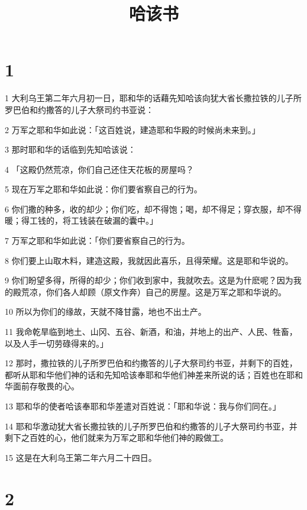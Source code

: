 

\title{哈该书}


\chapter{1}

\par 1 大利乌王第二年六月初一日，耶和华的话藉先知哈该向犹大省长撒拉铁的儿子所罗巴伯和约撒答的儿子大祭司约书亚说：
\par 2 万军之耶和华如此说：「这百姓说，建造耶和华殿的时候尚未来到。」
\par 3 那时耶和华的话临到先知哈该说：
\par 4 「这殿仍然荒凉，你们自己还住天花板的房屋吗？
\par 5 现在万军之耶和华如此说：你们要省察自己的行为。
\par 6 你们撒的种多，收的却少；你们吃，却不得饱；喝，却不得足；穿衣服，却不得暖；得工钱的，将工钱装在破漏的囊中。」
\par 7 万军之耶和华如此说：「你们要省察自己的行为。
\par 8 你们要上山取木料，建造这殿，我就因此喜乐，且得荣耀。这是耶和华说的。
\par 9 你们盼望多得，所得的却少；你们收到家中，我就吹去。这是为什麽呢？因为我的殿荒凉，你们各人却顾（原文作奔）自己的房屋。这是万军之耶和华说的。
\par 10 所以为你们的缘故，天就不降甘露，地也不出土产。
\par 11 我命乾旱临到地土、山冈、五谷、新酒，和油，并地上的出产、人民、牲畜，以及人手一切劳碌得来的。」
\par 12 那时，撒拉铁的儿子所罗巴伯和约撒答的儿子大祭司约书亚，并剩下的百姓，都听从耶和华他们神的话和先知哈该奉耶和华他们神差来所说的话；百姓也在耶和华面前存敬畏的心。
\par 13 耶和华的使者哈该奉耶和华差遣对百姓说：「耶和华说：我与你们同在。」
\par 14 耶和华激动犹大省长撒拉铁的儿子所罗巴伯和约撒答的儿子大祭司约书亚，并剩下之百姓的心，他们就来为万军之耶和华他们神的殿做工。
\par 15 这是在大利乌王第二年六月二十四日。

\chapter{2}

